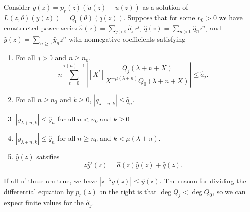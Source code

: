 \documentclass[10pt]{article}
\numberwithin{equation}{section}
\begin{document}
Consider
$y(z) = p_r(z)(\tilde{u}(z) - u(z))$ as a solution of $L(z, \theta)(y(z)) = Q_0(\theta)(q(z))$. Suppose that for some $n_0 > 0$ we have constructed power series $\hat{a}(z) = \sum_{j>0} \hat{a}_j z^j$, $\hat{q}(z)  = \sum_{n>0} \hat{q}_n z^n$, and $\hat{y}(z) = \sum_{n \ge 0} \hat{y}_n z^n$ with nonnegative coefficients satisfying
\begin{enumerate}
\item For all $j > 0$ and $n \ge n_0$,
\begin{equation*}
n \sum_{t=0}^{\tau(n) - 1} \left| [X^t] \frac{Q_j(\lambda+n+X)}{X^{-\mu(\lambda+n)}Q_0(\lambda+n+X)} \right| \le  \hat{a}_j \text{.}
\end{equation*}
\item For all $n \ge n_0$ and $k \ge 0$, $| q_{\lambda+n,k}| \le \hat{q}_n$.
\item $|y_{\lambda+n,k}| \le \hat{y}_n$ for all $n < n_0$ and $k \ge 0$.
\item $|y_{\lambda+n,k}| \le \hat{y}_n$ for all $n \ge n_0$ and $k < \mu(\lambda + n)$.
\item $\hat{y}(z)$ satsifies
\begin{equation*}
z \hat{y}'(z) = \hat{a}(z) \hat{y}(z) + \hat{q}(z)\text{.}
\end{equation*}
\end{enumerate}
If all of these are true, we have $|z^{-\lambda} y(z)| \le \hat{y}(z)$. The reason for dividing the differential equation by $p_r(z)$ on the right is that $\deg Q_j < \deg Q_0$, so we can expect finite values for the $\hat{a}_j$.
\end{document}
